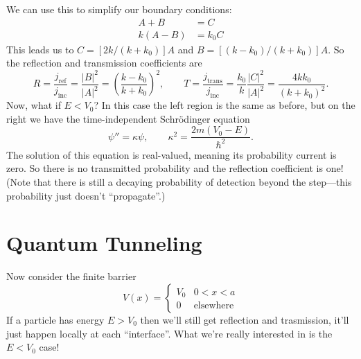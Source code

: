 \documentclass[../p052main.tex]{subfiles}
\begin{document}
We can use this to simplify our boundary conditions:
\begin{align*}
    A + B &= C \\
    k(A - B) &= k_0 C
\end{align*}
This leads us to $C = [2k / (k + k_0)] A$ and $B = [(k - k_0) / (k + k_0)]A$.
So the reflection and transmission coefficients are
\[ R = \frac{j_\textrm{ref}}{j_\textrm{inc}} = \frac{|B|^2}{|A|^2} = \left( \frac{k - k_0}{k + k_0} \right)^2, \qquad T = \frac{j_\textrm{trans}}{j_\textrm{inc}} = \frac{k_0}{k} \frac{|C|^2}{|A|^2} = \frac{4kk_0}{(k + k_0)^2}. \]
Now, what if $E < V_0$?
In this case the left region is the same as before, but on the right we have the time-independent Schrödinger equation
\[ \psi'' = \kappa \psi, \qquad \kappa^2 = \frac{2m(V_0 - E)}{\hbar^2}. \]
The solution of this equation is real-valued, meaning its probability current is zero.
So there is no transmitted probability and the reflection coefficient is one!
(Note that there is still a decaying probability of detection beyond the step---this probability just doesn't ``propagate''.)

\section{Quantum Tunneling}
Now consider the finite barrier
\[ V(x) = \begin{cases} V_0 & 0 < x < a \\ 0 & \text{elsewhere} \end{cases} \]
If a particle has energy $E > V_0$ then we'll still get reflection and trasmission, it'll just happen locally at each ``interface''.
What we're really interested in is the $E < V_0$ case!
\end{document}

